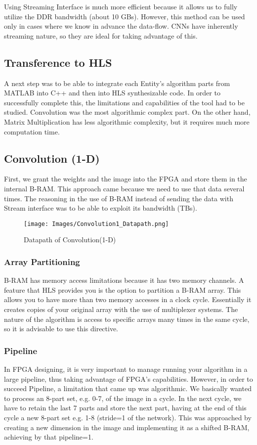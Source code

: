 Using Streaming Interface is much more efficient because it allows us to fully utilize the DDR bandwidth (about 10 GBs). However, this method can be used only in cases where we know in advance the data-flow. CNNs have inherently streaming nature, so they are ideal for taking advantage of this.

\subsection{Transference to HLS}

A next step was to be able to integrate each Entity's algorithm parts from MATLAB into C++ and then into HLS synthesizable code. In order to successfully complete this, the limitations and capabilities of the tool had to be studied. Convolution was the most algorithmic complex part. On the other hand, Matrix Multiplication has less algorithmic complexity, but it requires much more computation time.

\subsection {Convolution (1-D)}
First, we grant the weights and the image into the FPGA and store them in the internal B-RAM. This approach came because we need to use that data several times. The reasoning in the use of B-RAM instead of sending the data with Stream interface was to be able to exploit its bandwidth (TBs).

\begin{figure}[h]
\centering
\texttt{[image: Images/Convolution1\_Datapath.png]} 
\decoRule
\caption[Datapath of Convolution(1-D)]{Datapath of Convolution(1-D)}
\label{fig:22}
\end{figure}


\subsubsection{Array Partitioning}
B-RAM has memory access limitations because it has two memory channels. A feature that HLS provides you is the option to partition a B-RAM array. This allows you to have more than two memory accesses in a clock cycle. Essentially it creates copies of your original array with the use of multiplexer systems. The nature of the algorithm is access to specific arrays many times in the same cycle, so it is advisable to use this directive.

\subsubsection{Pipeline}
In FPGA designing, it is very important to manage running your algorithm in a large pipeline, thus taking advantage of FPGA's capabilities. However, in order to succeed Pipeline, a limitation that came up was algorithmic. We basically wanted to process an 8-part set, e.g. 0-7, of the image in a cycle. In the next cycle, we have to retain the last 7 parts and store the next part, having at the end of this cycle a new 8-part set e.g. 1-8 (stride=1 of the network). This was approached by creating a new dimension in the image and implementing it as a shifted B-RAM, achieving by that pipeline=1.

